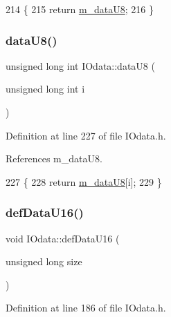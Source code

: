 \begin{DoxyCode}
214               \{
215     \textcolor{keywordflow}{return} \hyperlink{classIOdata_a9c4c0dc5104f7f3b170e30ab78fe61e7}{m\_dataU8};
216   \}
\end{DoxyCode}
\mbox{\label{classIOdata_a9c7cc68c435e1b22dcdac7c17d186e63}} 
\subsubsection{\texorpdfstring{data\+U8()}{dataU8()}\hspace{0.1cm}{\footnotesize\ttfamily [2/2]}}
{\footnotesize\ttfamily unsigned long int I\+Odata\+::data\+U8 (\begin{DoxyParamCaption}\item[{unsigned long int}]{i }\end{DoxyParamCaption})\hspace{0.3cm}{\ttfamily [inline]}}



Definition at line 227 of file I\+Odata.\+h.



References m\+\_\+data\+U8.


\begin{DoxyCode}
227                                                \{
228     \textcolor{keywordflow}{return} \hyperlink{classIOdata_a9c4c0dc5104f7f3b170e30ab78fe61e7}{m\_dataU8}[i];
229   \}
\end{DoxyCode}
\mbox{\label{classIOdata_a9e37c736d6dfb5223ed45786fad403da}} 
\subsubsection{\texorpdfstring{def\+Data\+U16()}{defDataU16()}}
{\footnotesize\ttfamily void I\+Odata\+::def\+Data\+U16 (\begin{DoxyParamCaption}\item[{unsigned long}]{size }\end{DoxyParamCaption})\hspace{0.3cm}{\ttfamily [inline]}}



Definition at line 186 of file I\+Odata.\+h.



